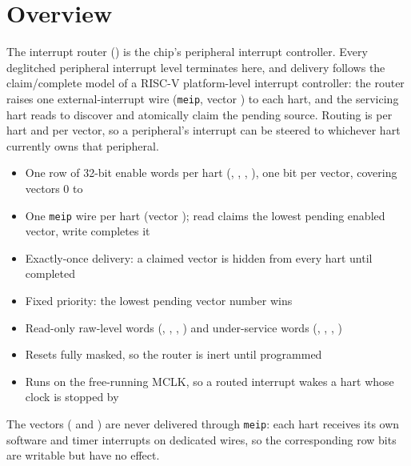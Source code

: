 \section{Overview}

The interrupt router () is the chip's peripheral interrupt controller. Every deglitched peripheral interrupt level terminates here, and delivery follows the claim/complete model of a RISC-V platform-level interrupt controller: the router raises one external-interrupt wire (\texttt{meip}, vector \MeipVector{}) to each hart, and the servicing hart reads  to discover and atomically claim the pending source. Routing is per hart and per vector, so a peripheral's interrupt can be steered to whichever hart currently owns that peripheral.

\begin{itemize}
	\item One row of \IrqEnableWordsWord{} 32-bit enable words per hart (, , , ), one bit per vector, covering vectors 0 to \TopVector{}
	\item One \texttt{meip} wire per hart (vector \MeipVector{});  read claims the lowest pending enabled vector,  write completes it
	\item Exactly-once delivery: a claimed vector is hidden from every hart until completed
	\item Fixed priority: the lowest pending vector number wins
	\item Read-only raw-level words (, , , ) and under-service words (, , , )
	\item Resets fully masked, so the router is inert until programmed
	\item Runs on the free-running MCLK, so a routed interrupt wakes a hart whose clock is stopped by 
\end{itemize}

The  vectors (\ClintMsipVector{} and \ClintMtipVector{}) are never delivered through \texttt{meip}: each hart receives its own software and timer interrupts on dedicated wires, so the corresponding row bits are writable but have no effect.

